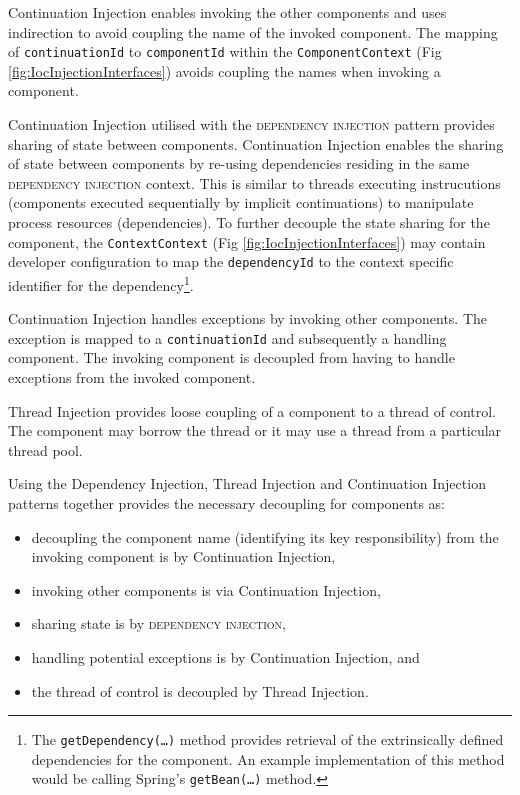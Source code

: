 \documentclass[prodmode]{style/acmlarge}
\begin{document}
Continuation Injection enables invoking the other components and uses
indirection to avoid coupling the name of the invoked component.  The mapping of
\texttt{continuationId} to \texttt{componentId} within the
\texttt{ComponentContext} (Fig \ref{fig:IocInjectionInterfaces}) avoids
coupling the names when invoking a component.

Continuation Injection utilised with the \textsc{dependency injection} pattern
\cite{ioc} provides sharing of state between components.  Continuation Injection
enables the sharing of state between components by re-using dependencies
residing in the same \textsc{dependency injection} context.  This is similar to
threads executing instrucutions (components executed sequentially by implicit
continuations) to manipulate process resources (dependencies).  To further
decouple the state sharing for the component, the \texttt{ContextContext} (Fig
\ref{fig:IocInjectionInterfaces}) may contain developer configuration to map the
\texttt{dependencyId} to the context specific identifier for the
dependency\footnote{The \texttt{getDependency(\ldots)} method provides retrieval
of the extrinsically defined dependencies for the component.  An example
implementation of this method would be calling Spring's \cite{spring}
\texttt{getBean(\ldots)} method.}.

Continuation Injection handles exceptions by invoking other components. The
exception is mapped to a \texttt{continuationId} and subsequently a handling
component.  The invoking component is decoupled from having to handle exceptions
from the invoked component.

Thread Injection provides loose coupling of a component to a thread of control.
The component may borrow the thread or it may use a thread from a particular
thread pool.

Using the Dependency Injection, Thread Injection and Continuation Injection
patterns together provides the necessary decoupling for components as:
\begin{itemize}
  \item decoupling the component name (identifying its key responsibility) from the invoking component is by Continuation Injection,
  \item invoking other components is via Continuation Injection,
  \item sharing state is by \textsc{dependency injection},
  \item handling potential exceptions is by Continuation Injection, and
  \item the thread of control is decoupled by Thread Injection.
\end{itemize}
\end{document}

